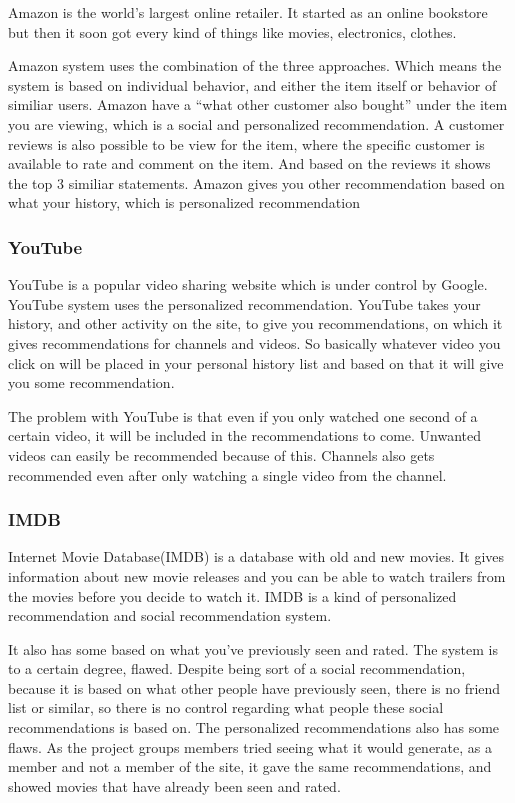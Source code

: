 Amazon is the world’s largest online retailer. It started as an online bookstore but then it soon got every kind of things like movies, electronics, clothes.

Amazon system uses the combination of the three approaches. Which means the system is based on individual behavior, and either the item itself or behavior of similiar users. Amazon have a “what other customer also bought” under the item you are viewing, which is a social and personalized recommendation. A customer reviews is also possible to be view for the item, where the specific customer is available to rate and comment on the item. And based on the reviews it shows the top 3 similiar statements. Amazon gives you other recommendation based on what your history, which is personalized recommendation

\subsubsection{YouTube}

YouTube is a popular video sharing website which is under control by Google. YouTube system uses the personalized recommendation. YouTube takes your history, and other activity on the site, to give you recommendations, on which it gives recommendations for channels and videos. So basically whatever video you click on will be placed in your personal history list and based on that it will give you some recommendation.

The problem with YouTube is that even if you only watched one second of a certain video, it will be included in the recommendations to come. Unwanted videos can easily be recommended because of this. Channels also gets recommended even after only watching a single video from the channel.

\subsubsection{IMDB}

Internet Movie Database(IMDB) is a database with old and new movies. It gives information about new movie releases and you can be able to watch trailers from the movies before you decide to watch it. IMDB is a kind of  personalized recommendation and social recommendation system. 

It also has some based on what you’ve previously seen and rated. The system is to a certain degree, flawed. Despite being sort of a social recommendation, because it is based on what other people have previously seen, there is no friend list or similar, so there is no control regarding what people these social recommendations is based on. The personalized recommendations also has some flaws. As the project groups members tried seeing what it would generate, as a member and not a member of the site, it gave the same recommendations, and showed movies that have already been seen and rated.

